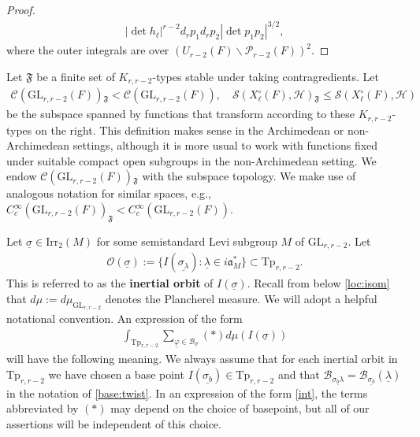 \documentclass[12pt]{amsart}
\theoremstyle{remark}
\numberwithin{equation}{section}
\newcommand{\GL}{\mathrm{GL}}
\theoremstyle{definition}
\numberwithin{equation}{subsection}
\begin{document}
\begin{proof}
\begin{align*}
{   |\det h_\ell|^{r-2}d_r p_1d_r p_2}{|\det p_1p_2|^{3/2}},
\end{align*}
where the outer integrals are over $(U_{r-2}(F) \backslash \mathcal{P}_{r-2}(F))^2.$
\end{proof}




Let $\mathfrak{F}$ be a finite set of $K_{r,r-2}$-types stable under taking contragredients. Let \index{$\mathcal{C}(\GL_{r,r-2}(F))_{\mathfrak{F}}$} 
\begin{align} \label{types} 
\mathcal{C}(\GL_{r,r-2}(F)){}_{\mathfrak{F}}<\mathcal{C}(\GL_{r,r-2}(F)),\quad 
\mathcal{S}(X_\ell^\circ(F),\mathcal{H}){}_{\mathfrak{F}}\leq \mathcal{S}(X_{\ell}^\circ(F),\mathcal{H}) 
\end{align}
be the subspace spanned by functions that transform according to these $K_{r,r-2}$-types on the right.  
This definition makes sense in the Archimedean or non-Archimedean settings, although it is more usual to work with functions fixed under suitable compact open subgroups in the non-Archimedean setting. We endow $\mathcal{C}(\GL_{r,r-2}(F)){}_{\mathfrak{F}}$ with the subspace topology.
We make use of analogous notation for similar spaces, e.g.,~$C_c^\infty(\GL_{r,r-2}(F))_{\mathfrak{F}} < C_c^\infty(\GL_{r,r-2}(F)).$ 

Let 
$
\underline{\sigma} \in \mathrm{Irr}_2(M)
$
for some semistandard Levi subgroup $M$ of $\GL_{r,r-2}.$
Let 
\begin{align*}
    \mathcal{O}(\underline{\sigma}):=\{I(\underline{\sigma_{\lambda}}):\underline{\lambda} \in i \mathfrak{a}_M^\ast\} \subset \mathrm{Tp}_{r,r-2}.
\end{align*}
This is referred to as the \textbf{inertial orbit} of $I(\underline{\sigma}).$ 
Recall from  below \eqref{loc:isom} that $d\mu:=d\mu_{\GL_{r,r-2}}$ denotes the Plancherel measure. We will adopt a helpful notational convention.  
An expression of the form
\begin{align} \label{int}
\int_{\mathrm{Tp}_{r,r-2}}\sum_{\underline{\varphi} \in \mathcal{B}_{\underline{\sigma}}}(*) d\mu(I(\underline{\sigma}))
\end{align}
will have the following meaning.  
We always assume that for each inertial orbit in $\mathrm{Tp}_{r,r-2}$ we have chosen a base point $I(\underline{\sigma_b})
 \in \mathrm{Tp}_{r,r-2}$ and that $
\mathcal{B}_{\underline{\sigma_{b}\lambda}}=\mathcal{B}_{\underline{\sigma_{b}}}(\underline{\lambda})$ in the notation of \eqref{base:twist}.  In an expression of the form \eqref{int}, the terms abbreviated by $(*)$ may depend on the choice of basepoint, but all of our assertions will be independent of this choice.  
\end{document}
